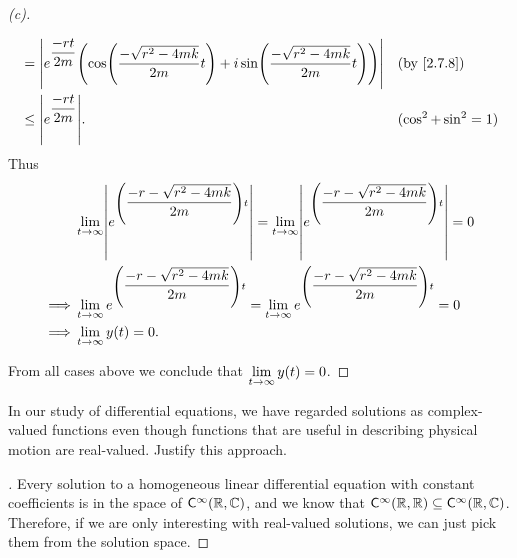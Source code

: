 \begin{proof}[(c)]
\begin{itemize}
\begin{align*}
             & = \abs{e^{\dfrac{-rt}{2m}} \pa{\cos\pa{\dfrac{-\sqrt{r^2 - 4mk}}{2m} t} + i \sin\pa{\dfrac{-\sqrt{r^2 - 4mk}}{2m} t}}} &  & \by{2.7.8}            \\
             & \leq \abs{e^{\dfrac{-rt}{2m}}}.                                                                                        &  & (\cos^2 + \sin^2 = 1)
          \end{align*}
          Thus
          \begin{align*}
                     & \Lim_{t \to \infty} \abs{e^{\pa{\dfrac{-r - \sqrt{r^2 - 4mk}}{2m}} t}} = \Lim_{t \to \infty} \abs{e^{\pa{\dfrac{-r - \sqrt{r^2 - 4mk}}{2m}} t}} = 0 \\
            \implies & \Lim_{t \to \infty} e^{\pa{\dfrac{-r - \sqrt{r^2 - 4mk}}{2m}} t} = \Lim_{t \to \infty} e^{\pa{\dfrac{-r - \sqrt{r^2 - 4mk}}{2m}} t} = 0             \\
            \implies & \Lim_{t \to \infty} y(t) = 0.
          \end{align*}
  \end{itemize}
  From all cases above we conclude that \(\lim\limits_{t \to \infty} y(t) = 0\).
\end{proof}

\begin{ex}\label{ex:2.7.19}
  In our study of differential equations, we have regarded solutions as complex-valued functions even though functions that are useful in describing physical motion are real-valued.
  Justify this approach.
\end{ex}

\begin{proof}[]
  Every solution to a homogeneous linear differential equation with constant coefficients is in the space of \(\cfs[\infty](\R, \C)\), and we know that \(\cfs[\infty](\R, \R) \subseteq \cfs[\infty](\R, \C)\).
  Therefore, if we are only interesting with real-valued solutions, we can just pick them from the solution space.
\end{proof}
